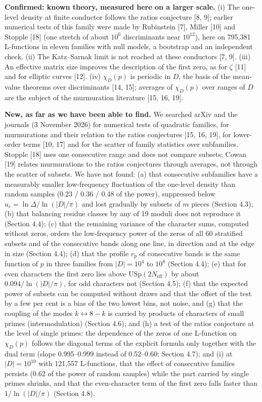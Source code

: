 \documentclass[
  10pt,
]{article}
\begin{document}
\textbf{Confirmed: known theory, measured here on a larger scale.} (i)
The one-level density at finite conductor follows the ratios conjecture
{[}8, 9{]}; earlier numerical tests of this family were made by
Rubinstein {[}7{]}, Miller {[}10{]} and Stopple {[}18{]} (one stretch of
about \(10^6\) discriminants near \(10^{12}\)), here on 795,381
L-functions in eleven families with null models, a bootstrap and an
independent check. (ii) The Katz--Sarnak limit is not reached at these
conductors {[}7, 9{]}. (iii) An effective matrix size improves the
description of the first zero, as for \(\zeta\) {[}11{]} and for
elliptic curves {[}12{]}. (iv) \(\chi_D(p)\) is periodic in \(D\), the
basis of the mean-value theorems over discriminants {[}14, 15{]};
averages of \(\chi_D(p)\) over ranges of \(D\) are the subject of the
murmuration literature {[}15, 16, 19{]}.

\textbf{New, as far as we have been able to find.} We searched arXiv and
the journals (3 November 2026) for numerical tests of quadratic
families, for murmurations and their relation to the ratios conjectures
{[}15, 16, 19{]}, for lower-order terms {[}10, 17{]} and for the scatter
of family statistics over subfamilies. Stopple {[}18{]} uses one
consecutive range and does not compare subsets; Cowan {[}19{]} relates
murmurations to the ratios conjectures through averages, not through the
scatter of subsets. We have not found: (a) that consecutive subfamilies
have a measurably smaller low-frequency fluctuation of the one-level
density than random samples (0.23 / 0.36 / 0.48 of the power),
suppressed below \(u_c = \ln\Delta/\ln(|D|/\pi)\) and lost gradually by
subsets of \(m\) pieces (Section 4.3); (b) that balancing residue
classes by any of 19 moduli does not reproduce it (Section 4.4); (c)
that the remaining variance of the character sums, computed without
zeros, orders the low-frequency power of the zeros of all 60 stratified
subsets and of the consecutive bands along one line, in direction and at
the edge in size (Section 4.4); (d) that the profile \(r_p\) of
consecutive bands is the same function of \(p\) in three families from
\(|D| = 10^4\) to \(10^8\) (Section 4.4); (e) that for even characters
the first zero lies above USp\((2N_{\mathrm{eff}})\) by about
\(0.094/\ln(|D|/\pi)\), for odd characters not (Section 4.5); (f) that
the expected power of subsets can be computed without draws and that the
offset of the test by a few per cent is a bias of the two lowest bins,
not noise, and (g) that the coupling of the modes
\(k \leftrightarrow 8 - k\) is carried by products of characters of
small primes (intermodulation) (Section 4.6); and (h) a test of the
ratios conjecture at the level of single primes: the dependence of the
zeros of one L-function on \(\chi_D(p)\) follows the diagonal terms of
the explicit formula only together with the dual term (slope
0.995--0.999 instead of 0.52--0.60; Section 4.7); and (i) at
\(|D| = 10^{10}\) with 121,557 L-functions, that the effect of
consecutive families persists (0.62 of the power of random samples)
while the part carried by single primes shrinks, and that the
even-character term of the first zero falls faster than
\(1/\ln(|D|/\pi)\) (Section 4.8).
\end{document}
